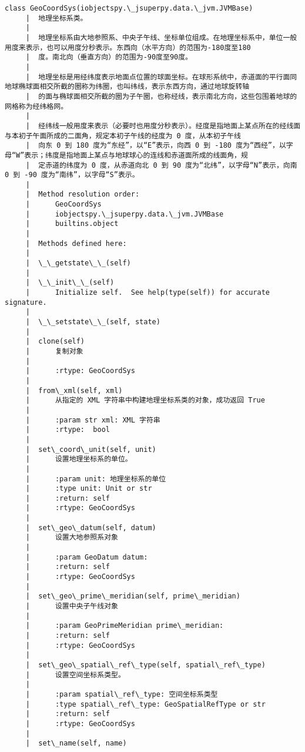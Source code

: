 \documentclass[11pt]{article}
\begin{document}
\begin{Verbatim}[commandchars=\\\{\}]
    class GeoCoordSys(iobjectspy.\_jsuperpy.data.\_jvm.JVMBase)
     |  地理坐标系类。
     |  
     |  地理坐标系由大地参照系、中央子午线、坐标单位组成。在地理坐标系中，单位一般用度来表示，也可以用度分秒表示。东西向（水平方向）的范围为-180度至180
     |  度。南北向（垂直方向）的范围为-90度至90度。
     |  
     |  地理坐标是用经纬度表示地面点位置的球面坐标。在球形系统中，赤道面的平行面同地球椭球面相交所截的圈称为纬圈，也叫纬线，表示东西方向，通过地球旋转轴
     |  的面与椭球面相交所截的圈为子午圈，也称经线，表示南北方向，这些包围着地球的网格称为经纬格网。
     |  
     |  经纬线一般用度来表示（必要时也用度分秒表示）。经度是指地面上某点所在的经线面与本初子午面所成的二面角，规定本初子午线的经度为 0 度，从本初子午线
     |  向东 0 到 180 度为“东经”，以“E”表示，向西 0 到 -180 度为“西经”，以字母“W”表示；纬度是指地面上某点与地球球心的连线和赤道面所成的线面角，规
     |  定赤道的纬度为 0 度，从赤道向北 0 到 90 度为“北纬”，以字母“N”表示，向南 0 到 -90 度为“南纬”，以字母“S”表示。
     |  
     |  Method resolution order:
     |      GeoCoordSys
     |      iobjectspy.\_jsuperpy.data.\_jvm.JVMBase
     |      builtins.object
     |  
     |  Methods defined here:
     |  
     |  \_\_getstate\_\_(self)
     |  
     |  \_\_init\_\_(self)
     |      Initialize self.  See help(type(self)) for accurate signature.
     |  
     |  \_\_setstate\_\_(self, state)
     |  
     |  clone(self)
     |      复制对象
     |      
     |      :rtype: GeoCoordSys
     |  
     |  from\_xml(self, xml)
     |      从指定的 XML 字符串中构建地理坐标系类的对象，成功返回 True
     |      
     |      :param str xml: XML 字符串
     |      :rtype:  bool
     |  
     |  set\_coord\_unit(self, unit)
     |      设置地理坐标系的单位。
     |      
     |      :param unit: 地理坐标系的单位
     |      :type unit: Unit or str
     |      :return: self
     |      :rtype: GeoCoordSys
     |  
     |  set\_geo\_datum(self, datum)
     |      设置大地参照系对象
     |      
     |      :param GeoDatum datum:
     |      :return: self
     |      :rtype: GeoCoordSys
     |  
     |  set\_geo\_prime\_meridian(self, prime\_meridian)
     |      设置中央子午线对象
     |      
     |      :param GeoPrimeMeridian prime\_meridian:
     |      :return: self
     |      :rtype: GeoCoordSys
     |  
     |  set\_geo\_spatial\_ref\_type(self, spatial\_ref\_type)
     |      设置空间坐标系类型。
     |      
     |      :param spatial\_ref\_type: 空间坐标系类型
     |      :type spatial\_ref\_type: GeoSpatialRefType or str
     |      :return: self
     |      :rtype: GeoCoordSys
     |  
     |  set\_name(self, name)

\end{Verbatim}
\end{document}
